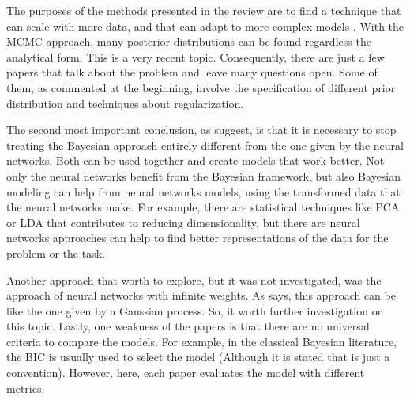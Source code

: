 \documentclass{article}
\begin{document}
The purposes of the methods presented in the review are to find a technique that can scale with more data, and that can adapt to more complex models \cite{gal2016uncertainty}. With the MCMC approach, many posterior distributions can be found regardless the analytical form. This is a very recent topic. Consequently, there are just a few papers that talk about the problem and leave many questions open. Some of them, as commented at the beginning, involve the specification of different prior distribution and techniques about regularization.

The second most important conclusion, as \cite{gal2016uncertainty} suggest, is that it is necessary to stop treating the Bayesian approach entirely different from the one given by the neural networks. Both can be used together and create models that work better. Not only the neural networks benefit from the Bayesian framework, but also Bayesian modeling can help from neural networks models, using the transformed data that the neural networks make. For example, there are statistical techniques like PCA or LDA that contributes to reducing dimensionality, but there are neural networks approaches can help to find better representations of the data for the problem or the task.

Another approach that worth to explore, but it was not investigated, was the approach of neural networks with infinite weights. As \cite{neal2012bayesian} says, this approach can be like the one given by a Gaussian process. So, it worth further investigation on this topic. Lastly, one weakness of the papers is that there are no universal criteria to compare the models. For example, in the classical Bayesian literature, the BIC is usually used to select the model \cite{gelman2014bayesian} (Although it is stated that is just a convention).  However, here, each paper evaluates the model with different metrics.

\newpage

\end{document}
